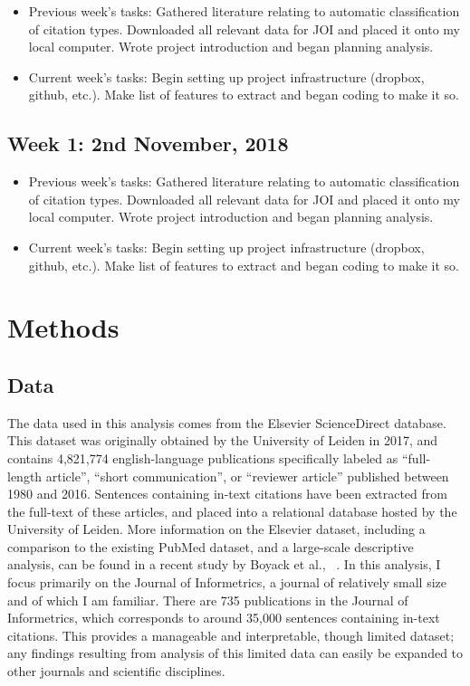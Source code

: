 \documentclass[
10pt, %
a4paper, %
oneside, %
headinclude,footinclude, %
BCOR5mm, %
]{scrartcl}
\begin{document}
\begin{itemize}
\item Previous week's tasks: Gathered literature relating to automatic classification of citation types. Downloaded all relevant data for JOI and placed it onto my local computer. Wrote project introduction and began planning analysis.
\item Current week's tasks: Begin setting up project infrastructure (dropbox, github, etc.). Make list of features to extract and began coding to make it so. 
\end{itemize}

\subsection{Week 1: 2nd November, 2018}

\begin{itemize}
\item Previous week's tasks: Gathered literature relating to automatic classification of citation types. Downloaded all relevant data for JOI and placed it onto my local computer. Wrote project introduction and began planning analysis.
\item Current week's tasks: Begin setting up project infrastructure (dropbox, github, etc.). Make list of features to extract and began coding to make it so. 
\end{itemize}



\section{Methods}

\subsection{Data}
The data used in this analysis comes from the Elsevier ScienceDirect database. This dataset was originally obtained by the University of Leiden in 2017, and contains 4,821,774 english-language publications specifically labeled as “full-length article”, “short communication”, or “reviewer article” published between 1980 and 2016. Sentences containing in-text citations have been extracted from the full-text of these articles, and placed into a relational database hosted by the University of Leiden. More information on the Elsevier dataset, including a comparison to the existing PubMed dataset, and a large-scale descriptive analysis, can be found in a recent study by Boyack et al.,  ~\cite{boyack_characterizing_2018}. In this analysis, I focus primarily on the Journal of Informetrics, a journal of relatively small size and of which I am familiar. There are 735 publications in the Journal of Informetrics, which corresponds to around 35,000 sentences containing in-text citations. This provides a manageable and interpretable, though limited dataset; any findings resulting from analysis of this limited data can easily be expanded to other journals and scientific disciplines. 
\end{document}

